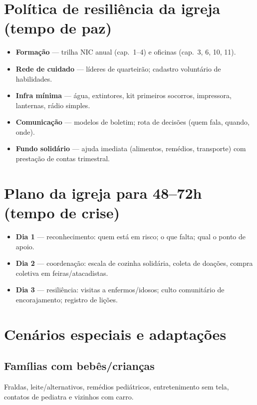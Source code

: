 \section{Política de resiliência da igreja (tempo de paz)}
\begin{checklist}[title={5 frentes permanentes},breakable]
\begin{itemize}[leftmargin=*,noitemsep]
  \item \textbf{Formação} — trilha NIC anual (cap.~1--4) e oficinas (cap.~3, 6, 10, 11).
  \item \textbf{Rede de cuidado} — líderes de quarteirão; cadastro voluntário de habilidades.
  \item \textbf{Infra mínima} — água, extintores, kit primeiros socorros, impressora, lanternas, rádio simples.
  \item \textbf{Comunicação} — modelos de boletim; rota de decisões (quem fala, quando, onde).
  \item \textbf{Fundo solidário} — ajuda imediata (alimentos, remédios, transporte) com prestação de contas trimestral.
\end{itemize}
\end{checklist}

\section{Plano da igreja para 48--72h (tempo de crise)}
\begin{checklist}[title={Operação básica da comunidade},breakable]
\begin{itemize}[leftmargin=*,noitemsep]
  \item \textbf{Dia 1} — reconhecimento: quem está em risco; o que falta; qual o ponto de apoio.
  \item \textbf{Dia 2} — coordenação: escala de cozinha solidária, coleta de doações, compra coletiva em feiras/atacadistas.
  \item \textbf{Dia 3} — resiliência: visitas a enfermos/idosos; culto comunitário de encorajamento; registro de lições.
\end{itemize}
\end{checklist}

\section{Cenários especiais e adaptações}
\subsection*{Famílias com bebês/crianças}
Fraldas, leite/alternativos, remédios pediátricos, entretenimento sem tela, contatos de pediatra e vizinhos com carro.
